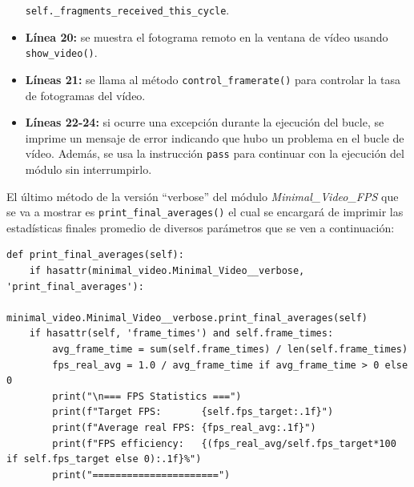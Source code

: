 \begin{itemize}
    \texttt{self.\_fragments\_received\_this\_cycle}.
    \item \textbf{Línea 20:} se muestra el fotograma remoto en la ventana de vídeo usando \texttt{show\_video()}.
    \item \textbf{Líneas 21:} se llama al método \texttt{control\_framerate()} para controlar la tasa de fotogramas del vídeo.
    \item \textbf{Líneas 22-24:} si ocurre una excepción durante la ejecución del bucle, se imprime un mensaje de error indicando que hubo un problema en el bucle de vídeo. Además, se usa la instrucción \texttt{pass} para continuar con la ejecución del módulo sin interrumpirlo.    
\end{itemize}
\vspace{\baselineskip}

El último método de la versión ``verbose'' del módulo \textit{Minimal\_Video\_FPS} que se va a mostrar es \texttt{print\_final\_averages()} el cual se encargará de imprimir las estadísticas finales promedio de diversos parámetros que se ven a continuación:
\begin{lstlisting}[style=pythonstyle, caption={Método \texttt{print\_final\_averages()} de \textit{Minimal\_Video\_FPS\_verbose}.}, label={lst:print_final_averages_minimal_video_fps_verbose}]
def print_final_averages(self):
    if hasattr(minimal_video.Minimal_Video__verbose, 'print_final_averages'):
        minimal_video.Minimal_Video__verbose.print_final_averages(self)
    if hasattr(self, 'frame_times') and self.frame_times:
        avg_frame_time = sum(self.frame_times) / len(self.frame_times)
        fps_real_avg = 1.0 / avg_frame_time if avg_frame_time > 0 else 0
        print("\n=== FPS Statistics ===")
        print(f"Target FPS:       {self.fps_target:.1f}")
        print(f"Average real FPS: {fps_real_avg:.1f}")
        print(f"FPS efficiency:   {(fps_real_avg/self.fps_target*100 if self.fps_target else 0):.1f}%")
        print("======================")
\end{lstlisting}
\vspace{\baselineskip}

